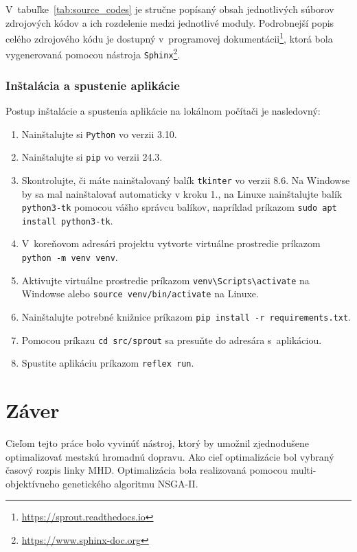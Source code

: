 V~tabuľke~\ref{tab:source_codes} je stručne popísaný obsah jednotlivých súborov zdrojových kódov a ich rozdelenie medzi jednotlivé moduly.
Podrobnejší popis celého zdrojového kódu je dostupný v~programovej dokumentácii\footnote{\url{https://sprout.readthedocs.io}}, ktorá bola vygenerovaná pomocou nástroja \texttt{Sphinx}\footnote{\url{https://www.sphinx-doc.org}}.

\subsection*{Inštalácia a spustenie aplikácie}
Postup inštalácie a spustenia aplikácie na lokálnom počítači je nasledovný:
\begin{enumerate}
  \item Nainštalujte si \texttt{Python} vo verzii 3.10.
  \item Nainštalujte si \texttt{pip} vo verzii 24.3.
  \item Skontrolujte, či máte nainštalovaný balík \texttt{tkinter} vo verzii 8.6. Na Windowse by sa mal nainštalovať automaticky v kroku 1., na Linuxe nainštalujte balík \texttt{python3-tk} pomocou vášho správcu balíkov, napríklad príkazom \texttt{sudo apt install python3-tk}.
  \item V~koreňovom adresári projektu vytvorte virtuálne prostredie príkazom \texttt{python -m venv venv}.
  \item Aktivujte virtuálne prostredie príkazom \texttt{venv\textbackslash Scripts\textbackslash activate} na Windowse alebo \texttt{source venv/bin/activate} na Linuxe.
  \item Nainštalujte potrebné knižnice príkazom \texttt{pip install -r requirements.txt}.
  \item Pomocou príkazu \texttt{cd src/sprout} sa presuňte do adresára s~aplikáciou.
  \item Spustite aplikáciu príkazom \texttt{reflex run}.
\end{enumerate}

\chapter{Záver}\label{zaver}

Cieľom tejto práce bolo vyvinúť nástroj, ktorý by umožnil zjednodušene optimalizovať mestskú hromadnú dopravu.
Ako cieľ optimalizácie bol vybraný časový rozpis linky MHD.
Optimalizácia bola realizovaná pomocou multi-objektívneho genetického algoritmu NSGA-II.

